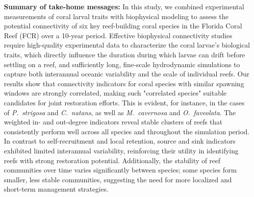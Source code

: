 \documentclass[preprint,12pt,authoryear]{elsarticle}
\begin{document}
\textbf{Summary of take-home messages:} In this study, we combined experimental measurements of coral larval traits with biophysical modeling to assess the potential connectivity of six key reef-building coral species in the Florida Coral Reef (FCR) over a 10-year period. Effective biophysical connectivity studies require high-quality experimental data to characterize the coral larvae's biological traits, which directly influence the duration during which larvae can drift before settling on a reef, and sufficiently long, fine-scale hydrodynamic simulations to capture both interannual oceanic variability and the scale of individual reefs. Our results show that connectivity indicators for coral species with similar spawning windows are strongly correlated, making such "correlated species" suitable candidates for joint restoration efforts. This is evident, for instance, in the cases of \textit{P.~strigosa} and \textit{C.~natans}, as well as \textit{M.~cavernosa} and \textit{O.~faveolata}. The weighted in- and out-degree indicators reveal stable clusters of reefs that consistently perform well across all species and throughout the simulation period. In contrast to self-recruitment and local retention, source and sink indicators exhibited limited interannual variability, reinforcing their utility in identifying reefs with strong restoration potential. Additionally, the stability of reef communities over time varies significantly between species; some species form smaller, less stable communities, suggesting the need for more localized and short-term management strategies.
\end{document}
